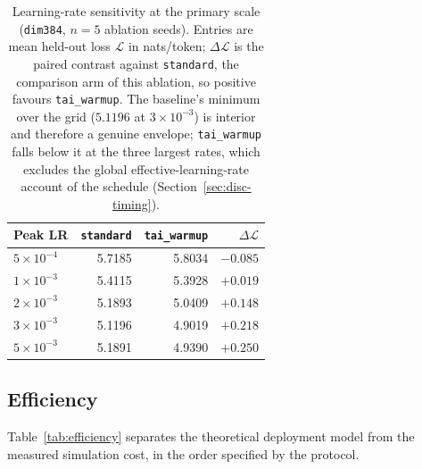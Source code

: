 \documentclass[final,5p,times,twocolumn]{elsarticle}
\theoremstyle{remark}
\newcommand{\dL}{\Delta\mathcal{L}}
\begin{document}
\begin{table}[t]
\centering
\small
\caption{Learning-rate sensitivity at the primary scale (\texttt{dim384},
$n = 5$ ablation seeds). Entries are mean held-out loss $\mathcal{L}$ in
nats/token; $\dL$ is the paired contrast against \texttt{standard}, the
comparison arm of this ablation, so positive favours
\texttt{tai\_warmup}. The baseline's minimum over the grid ($5.1196$ at
$3\times 10^{-3}$) is interior and therefore a genuine envelope;
\texttt{tai\_warmup} falls below it at the three largest rates, which excludes
the global effective-learning-rate account of the schedule
(Section~\ref{sec:disc-timing}).}
\label{tab:lrsens}
\begin{tabular}{@{}lrrr@{}}
\toprule
Peak LR & \texttt{standard} & \texttt{tai\_warmup} & $\dL$ \\
\midrule
$5\times 10^{-4}$ & 5.7185 & 5.8034 & $-0.085$ \\
$1\times 10^{-3}$ & 5.4115 & 5.3928 & $+0.019$ \\
$2\times 10^{-3}$ & 5.1893 & 5.0409 & $+0.148$ \\
$3\times 10^{-3}$ & 5.1196 & 4.9019 & $+0.218$ \\
$5\times 10^{-3}$ & 5.1891 & 4.9390 & $+0.250$ \\
\bottomrule
\end{tabular}
\end{table}

\subsection{Efficiency}
\label{sec:res-eff}

Table~\ref{tab:efficiency} separates the theoretical deployment model from the
measured simulation cost, in the order specified by the protocol.
\end{document}
